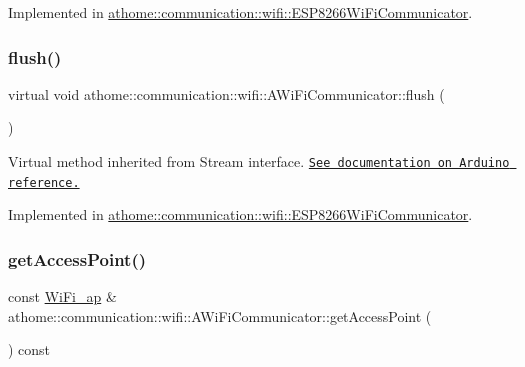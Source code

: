 Implemented in \mbox{\hyperlink{classathome_1_1communication_1_1wifi_1_1_e_s_p8266_wi_fi_communicator_a0f8adbe1b1d219148c4f340980056356}{athome\+::communication\+::wifi\+::\+E\+S\+P8266\+Wi\+Fi\+Communicator}}.

\mbox{\label{classathome_1_1communication_1_1wifi_1_1_a_wi_fi_communicator_aa974255c8bdbae19d3d4bd0f1a50318f}} 
\subsubsection{\texorpdfstring{flush()}{flush()}}
{\footnotesize\ttfamily virtual void athome\+::communication\+::wifi\+::\+A\+Wi\+Fi\+Communicator\+::flush (\begin{DoxyParamCaption}{ }\end{DoxyParamCaption})\hspace{0.3cm}{\ttfamily [pure virtual]}}

Virtual method inherited from Stream interface. \href{https://www.arduino.cc/reference/en/language/functions/communication/stream/streamflush/}{\tt See documentation on Arduino reference.} 

Implemented in \mbox{\hyperlink{classathome_1_1communication_1_1wifi_1_1_e_s_p8266_wi_fi_communicator_af95ca7f47285b13fc895e0d9323ee320}{athome\+::communication\+::wifi\+::\+E\+S\+P8266\+Wi\+Fi\+Communicator}}.

\mbox{\label{classathome_1_1communication_1_1wifi_1_1_a_wi_fi_communicator_abef86486512e4a39d61df3b27effcc87}} 
\subsubsection{\texorpdfstring{get\+Access\+Point()}{getAccessPoint()}}
{\footnotesize\ttfamily const \mbox{\hyperlink{structathome_1_1communication_1_1wifi_1_1s__wifi__access__point}{Wi\+Fi\+\_\+ap}} \& athome\+::communication\+::wifi\+::\+A\+Wi\+Fi\+Communicator\+::get\+Access\+Point (\begin{DoxyParamCaption}{ }\end{DoxyParamCaption}) const}


